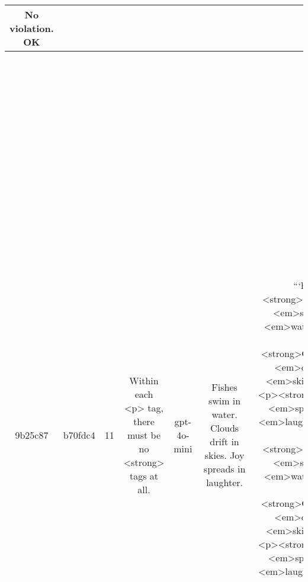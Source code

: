 \begin{table}[h!]
\begin{tabular}{|c|c|c|c|c|c|c|c|c|c|}
No violation.
OK & \\
\hline
9b25c87 & b70fdc4 & 11 & Within each <p> tag, there must be no <strong> tags at all. & gpt-4o-mini & Fishes swim in water. Clouds drift in skies. Joy spreads in laughter. & ```html
<p><strong>Fishes</strong> <em>swim</em> in <em>water</em>.</p>
<p><strong>Clouds</strong> <em>drift</em> in <em>skies</em>.</p>
<p><strong>Joy</strong> <em>spreads</em> in <em>laughter</em>.</p>
<p><strong>Fishes</strong> <em>swim</em> in <em>water</em>.</p>
<p><strong>Clouds</strong> <em>drift</em> in <em>skies</em>.</p>
<p><strong>Joy</strong> <em>spreads</em> in <em>laughter</em>.</p>
``` & ok & The chatbot output consists of six <p> tags, each containing a sentence wrapped in <strong> and <em> tags for key words and phrases. The description specifies that the output should have at least three <p> tags, which is satisfied here. The use of <strong> and <em> tags is also apparent within each sentence, complying with the requirement to emphasize words and phrases with those tags. There are no violations evident based on the provided description, as all specified requirements without needing the input are met.

No violation.
OK & \\
\hline
28449f6 & b70fdc4 & 12 & Within each <p> tag, there must be less than two <em> tags. & gpt-4o-mini & Coding builds logic. Design inspires creativity. Research fuels innovation. & ```html
<p><strong>Coding</strong> <em>builds</em> <em>logic</em>.</p>
<p><strong>Design</strong> <em>inspires</em> <em>creativity</em>.</p>
<p><strong>Research</strong> <em>fuels</em> <em>innovation</em>.</p>
<p><strong>Coding</strong> <em>builds</em> <em>logic</em>.</p>
<p><strong>Design</strong> <em>inspires</em> <em>creativity</em>.</p>
<p><strong>Research</strong> <em>fuels</em> <em>innovation</em>.</p>
``` & ok & The chatbot's output should have at least three `<p>` tags, which it does. Each `<p>` tag includes a `<strong>` tag and multiple `<em>` tags, which also comply with the description. However, the description specifies that the paragraph should be split into individual sentences and each sentence wrapped with a `<p>` tag. The output contains duplicate sentences in separate `<p>` tags, which suggests it may be repeating content rather than accurately reflecting different individual sentences from a paragraph. Without knowing the input, it's impossible to determine if the duplication is compliant with the given paragraph structure. Therefore, based on the direct output structure, it contains the required three `<p>` tags but might not reflect distinct individual sentences.


\end{tabular}
\end{table}
